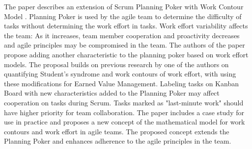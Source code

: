 
\begin{Abstrakt}
    The paper describes an extension of Scrum Planning Poker with Work Contour Model . Planning Poker is used by the agile team to determine the difficulty of tasks without determining the work effort in tasks. Work effort variability affects the team: As it increases, team member cooperation and proactivity decreases and agile principles may be compromised in the team. The authors of the paper propose adding another characteristic to the planning poker based on work effort models. The proposal builds on previous research by one of the authors on quantifying Student's syndrome and work contours of work effort, with using these modifications for Earned Value Management. Labeling tasks on Kanban Board with new characteristics added to the Planning Poker may affect cooperation on tasks during Scrum. Tasks marked as "last-minute work" should have higher priority for team collaboration. The paper includes a case study for use in practice and proposes a new concept of the mathematical model for work contours and work effort in agile teams. The proposed concept extends the Planning Poker and enhances adherence to the agile principles in the team.
\end{Abstrakt}



\clearpage